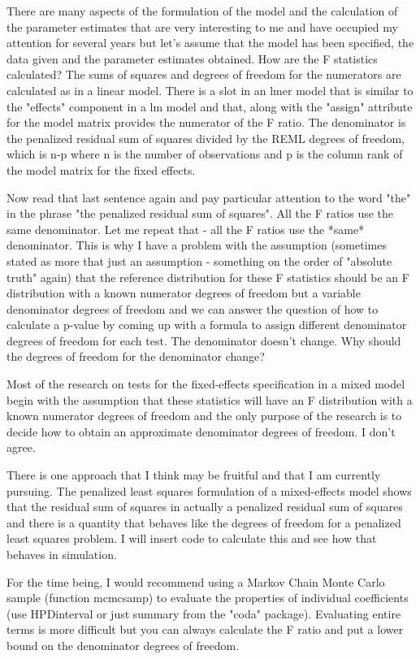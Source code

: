 There are many aspects of the formulation of the model and the
calculation of the parameter estimates that are very interesting to me
and have occupied my attention for several years but let's assume that
the model has been specified, the data given and the parameter
estimates obtained.  How are the F statistics calculated?  The sums of
squares and degrees of freedom for the numerators are calculated as in
a linear model.  There is a slot in an lmer model that is similar to
the "effects" component in a lm model and that, along with the
"assign" attribute for the model matrix provides the numerator of the
F ratio.  The denominator is the penalized residual sum of squares
divided by the REML degrees of freedom, which is n-p where n is the
number of observations and p is the column rank of the model matrix
for the fixed effects.

Now read that last sentence again and pay particular attention to the
word "the" in the phrase "the penalized residual sum of squares".  All
the F ratios use the same denominator.  Let me repeat that - all the F
ratios use the *same* denominator.  This is why I have a problem with
the assumption (sometimes stated as more that just an assumption -
something on the order of "absolute truth" again) that the reference
distribution for these F statistics should be an F distribution with a
known numerator degrees of freedom but a variable denominator degrees
of freedom and we can answer the question of how to calculate a
p-value by coming up with a formula to assign different denominator
degrees of freedom for each test.  The denominator doesn't change.
Why should the degrees of freedom for the denominator change?

Most of the research on tests for the fixed-effects specification in a
mixed model begin with the assumption that these statistics will have
an F distribution with a known numerator degrees of freedom and the
only purpose of the research is to decide how to obtain an approximate
denominator degrees of freedom.  I don't agree.

There is one approach that I think may be fruitful and that I am
currently pursuing.  The penalized least squares formulation of a
mixed-effects model shows that the residual sum of squares in actually
a penalized residual sum of squares and there is a quantity that
behaves like the degrees of freedom for a penalized least squares
problem.  I will insert code to calculate this and see how that
behaves in simulation.

For the time being, I would recommend using a Markov Chain Monte Carlo
sample (function mcmcsamp) to evaluate the properties of individual
coefficients (use HPDinterval or just summary from the "coda"
package).  Evaluating entire terms is more difficult but you can
always calculate the F ratio and put a lower bound on the denominator
degrees of freedom.

